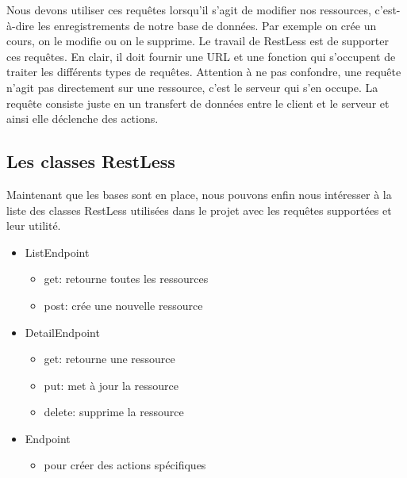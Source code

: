 \documentclass[a4paper,10pt,twoside]{sphinxmanual}
\begin{document}
Nous devons utiliser ces requêtes lorsqu'il s'agit de modifier nos ressources, c'est-à-dire les enregistrements de notre base de données. Par exemple on crée un cours, on le modifie ou on le supprime. Le travail de RestLess est de supporter ces requêtes. En clair, il doit fournir une URL et une fonction qui s'occupent de traiter les différents types de requêtes. Attention à ne pas confondre, une requête n'agit pas directement sur une ressource, c'est le serveur qui s'en occupe. La requête consiste juste en un transfert de données entre le client et le serveur et ainsi elle déclenche des actions.


\subsection{Les classes RestLess}
\label{restless:les-classes-restless}
Maintenant que les bases sont en place, nous pouvons enfin nous intéresser à la liste des classes RestLess utilisées dans le projet avec les requêtes supportées et leur utilité.
\begin{itemize}
\item {} 
ListEndpoint
\begin{itemize}
\item {} 
get: retourne toutes les ressources

\item {} 
post: crée une nouvelle ressource

\end{itemize}

\item {} 
DetailEndpoint
\begin{itemize}
\item {} 
get: retourne une ressource

\item {} 
put: met à jour la ressource

\item {} 
delete: supprime la ressource

\end{itemize}

\item {} 
Endpoint
\begin{itemize}
\item {} 
pour créer des actions spécifiques

\end{itemize}

\end{itemize}
\end{document}
